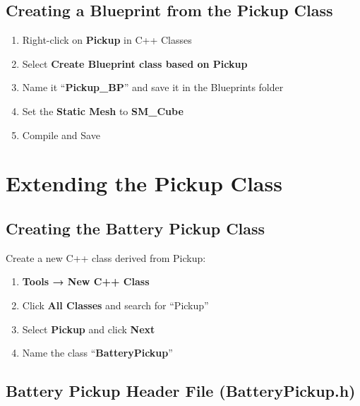\documentclass[
  letterpaper,
  DIV=11,
  numbers=noendperiod]{scrartcl}
\providecommand{\tightlist}{%
  \setlength{\itemsep}{0pt}\setlength{\parskip}{0pt}}
\begin{document}
\subsection{Creating a Blueprint from the Pickup
Class}\label{creating-a-blueprint-from-the-pickup-class}

\begin{enumerate}
\def\labelenumi{\arabic{enumi}.}
\tightlist
\item
  Right-click on \textbf{Pickup} in C++ Classes
\item
  Select \textbf{Create Blueprint class based on Pickup}
\item
  Name it ``\textbf{Pickup\_BP}'' and save it in the Blueprints folder
\item
  Set the \textbf{Static Mesh} to \textbf{SM\_Cube}
\item
  Compile and Save
\end{enumerate}

\section{Extending the Pickup Class}\label{extending-the-pickup-class}

\subsection{Creating the Battery Pickup
Class}\label{creating-the-battery-pickup-class}

Create a new C++ class derived from Pickup:

\begin{enumerate}
\def\labelenumi{\arabic{enumi}.}
\tightlist
\item
  \textbf{Tools → New C++ Class}
\item
  Click \textbf{All Classes} and search for ``Pickup''
\item
  Select \textbf{Pickup} and click \textbf{Next}
\item
  Name the class ``\textbf{BatteryPickup}''
\end{enumerate}

\subsection{Battery Pickup Header File
(BatteryPickup.h)}\label{battery-pickup-header-file-batterypickup.h}
\end{document}
